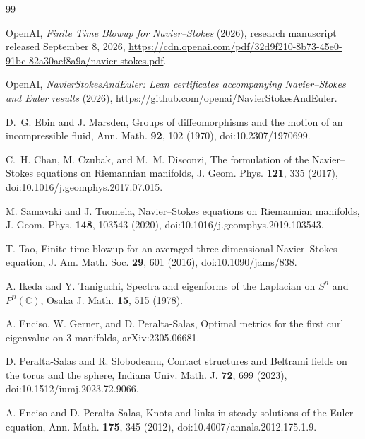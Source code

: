 \documentclass[aps,prd,reprint,superscriptaddress,nofootinbib,floatfix]{revtex4-2}
\theoremstyle{definition}
\theoremstyle{remark}
\begin{document}
\begin{thebibliography}{99}

	OpenAI, \emph{Finite Time Blowup for Navier--Stokes} (2026), research manuscript released September 8, 2026,
	\url{https://cdn.openai.com/pdf/32d9f210-8b73-45e0-91bc-82a30aef8a9a/navier-stokes.pdf}.

	OpenAI, \emph{NavierStokesAndEuler: Lean certificates accompanying Navier--Stokes and Euler results} (2026),
	\url{https://github.com/openai/NavierStokesAndEuler}.

	D.~G. Ebin and J. Marsden, Groups of diffeomorphisms and the motion of an incompressible fluid,
	Ann. Math. \textbf{92}, 102 (1970), doi:10.2307/1970699.

	C.~H. Chan, M. Czubak, and M.~M. Disconzi, The formulation of the Navier--Stokes equations on Riemannian manifolds,
	J. Geom. Phys. \textbf{121}, 335 (2017), doi:10.1016/j.geomphys.2017.07.015.

	M. Samavaki and J. Tuomela, Navier--Stokes equations on Riemannian manifolds,
	J. Geom. Phys. \textbf{148}, 103543 (2020), doi:10.1016/j.geomphys.2019.103543.

	T. Tao, Finite time blowup for an averaged three-dimensional Navier--Stokes equation,
	J. Am. Math. Soc. \textbf{29}, 601 (2016), doi:10.1090/jams/838.

	A. Ikeda and Y. Taniguchi, Spectra and eigenforms of the Laplacian on $S^n$ and $P^n(\mathbb C)$,
	Osaka J. Math. \textbf{15}, 515 (1978).

	A. Enciso, W. Gerner, and D. Peralta-Salas, Optimal metrics for the first curl eigenvalue on 3-manifolds,
	arXiv:2305.06681.

	D. Peralta-Salas and R. Slobodeanu, Contact structures and Beltrami fields on the torus and the sphere,
	Indiana Univ. Math. J. \textbf{72}, 699 (2023), doi:10.1512/iumj.2023.72.9066.

	A. Enciso and D. Peralta-Salas, Knots and links in steady solutions of the Euler equation,
	Ann. Math. \textbf{175}, 345 (2012), doi:10.4007/annals.2012.175.1.9.

\end{thebibliography}
\end{document}
